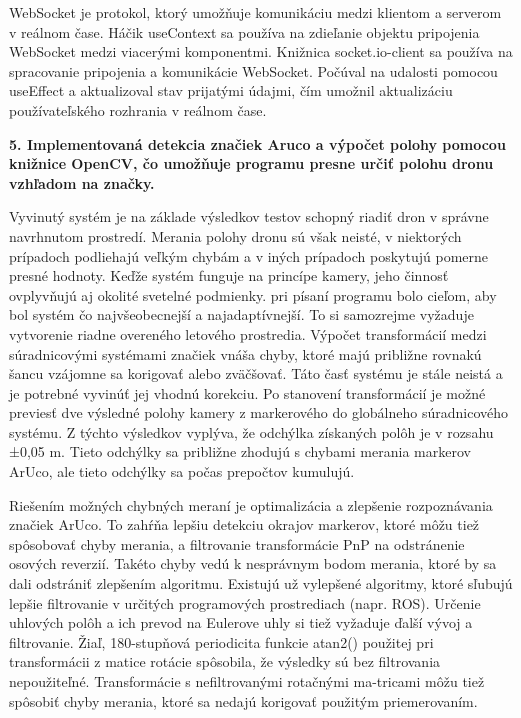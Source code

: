 WebSocket je protokol, ktorý umožňuje komunikáciu medzi klientom a serverom v reálnom čase.
Háčik useContext sa používa na zdieľanie objektu pripojenia WebSocket medzi viacerými komponentmi.
Knižnica socket.io-client sa používa na spracovanie pripojenia a komunikácie WebSocket.
Počúval na udalosti pomocou useEffect a aktualizoval stav prijatými údajmi, čím umožnil aktualizáciu používateľského rozhrania v reálnom čase.

\textbf{5. Implementovaná detekcia značiek Aruco a výpočet polohy pomocou knižnice OpenCV, čo umožňuje programu presne určiť polohu dronu vzhľadom na značky.}

Vyvinutý systém je na základe výsledkov testov schopný riadiť dron v správne navrhnutom prostredí. Merania polohy dronu sú však neisté, v niektorých prípadoch podliehajú veľkým chybám a v iných prípadoch poskytujú pomerne presné hodnoty. Keďže systém funguje na princípe kamery, jeho činnosť ovplyvňujú aj okolité svetelné podmienky. pri písaní programu bolo cieľom, aby bol systém čo najvšeobecnejší a najadaptívnejší. To si samozrejme vyžaduje vytvorenie riadne overeného letového prostredia. Výpočet transformácií medzi súradnicovými systémami značiek vnáša chyby, ktoré majú približne rovnakú šancu vzájomne sa korigovať alebo zväčšovať. Táto časť systému je stále neistá a je potrebné vyvinúť jej vhodnú korekciu. Po stanovení transformácií je možné previesť dve výsledné polohy kamery z markerového do globálneho súradnicového systému. Z týchto výsledkov vyplýva, že odchýlka získaných polôh je v rozsahu ±0,05 m. Tieto odchýlky sa približne zhodujú s chybami merania markerov ArUco, ale tieto odchýlky sa počas prepočtov kumulujú. 

Riešením možných chybných meraní je optimalizácia a zlepšenie rozpoznávania značiek ArUco. To zahŕňa lepšiu detekciu okrajov markerov, ktoré môžu tiež spôsobovať chyby merania, a filtrovanie transformácie PnP na odstránenie osových reverzií. Takéto chyby vedú k nesprávnym bodom merania, ktoré by sa dali odstrániť zlepšením algoritmu. Existujú už vylepšené algoritmy, ktoré sľubujú lepšie filtrovanie v určitých programových prostrediach (napr. ROS). \citep{SRS-aruco} Určenie uhlových polôh a ich prevod na Eulerove uhly si tiež vyžaduje ďalší vývoj a filtrovanie. Žiaľ, 180-stupňová periodicita funkcie atan2() použitej pri transformácii z matice rotácie \citep{Depriester2018} spôsobila, že výsledky sú bez filtrovania nepoužiteľné. Transformácie s nefiltrovanými rotačnými ma-tricami môžu tiež spôsobiť chyby merania, ktoré sa nedajú korigovať použitým priemerovaním.

